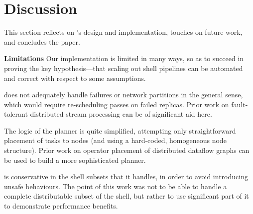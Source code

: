 \documentclass[sigplan,10pt,review,anonymous]{acmart}
\newcommand{\heading}[1]{\vspace{4pt}\noindent\textbf{#1}\enspace}
\newcommand{\km}[1]{[{\color{blue}#1 --- km}]}
\begin{document}
  

  


\section{Discussion}
\label{discussion}

This section reflects on \sys's design and implementation, touches on future work, and concludes the paper.

\heading{Limitations}
Our implementation is limited in many ways, so as to succeed in proving the key hypothesis---that scaling out shell pipelines can be automated and correct with respect to some assumptions.

\sys does not adequately handle failures or network partitions in the general sense, which would require re-scheduling passes on failed replicas.
Prior work on fault-tolerant distributed stream processing can be of significant aid here.

The logic of the planner is quite simplified, attempting only straightforward placement of tasks to nodes (and using a hard-coded, homogeneous node structure).
Prior work on operator placement of distributed dataflow graphs can be used to build a more sophisticated planner.

\sys is conservative in the shell subsets that it handles, in order to
avoid introducing unsafe behaviours. The point of this work was not to be
able to handle a complete distributable subset of the shell, but
rather to use significant part of it to demonstrate performance benefits.

\end{document}
